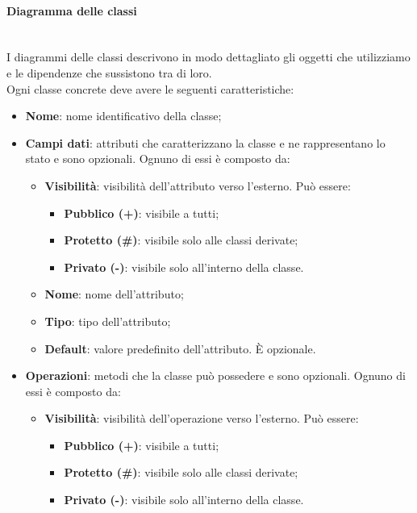 			\paragraph*{Diagramma delle classi}\mbox{}\\ [1mm]
			I diagrammi delle classi descrivono in modo dettagliato gli oggetti che utilizziamo e le dipendenze che sussistono tra di loro. \\
			Ogni classe concrete deve avere le seguenti caratteristiche:
			\begin{itemize}
				\item \textbf{Nome}: nome identificativo della classe;
				\item \textbf{Campi dati}: attributi che caratterizzano la classe e ne rappresentano lo stato e sono opzionali. Ognuno di essi è composto da:
					\begin{itemize}
						\item \textbf{Visibilità}: visibilità dell'attributo verso l'esterno. Può essere:
						\begin{itemize}
							\item \textbf{Pubblico (+)}: visibile a tutti;
							\item \textbf{Protetto (\#)}: visibile solo alle classi derivate;
							\item \textbf{Privato (-)}: visibile solo all'interno della classe.
						\end{itemize}
						\item \textbf{Nome}: nome dell'attributo;
						\item \textbf{Tipo}: tipo dell'attributo;
						\item \textbf{Default}: valore predefinito dell'attributo. È opzionale.
					\end{itemize}
				\item \textbf{Operazioni}: metodi che la classe può possedere e sono opzionali. Ognuno di essi è composto da:
					\begin{itemize}
						\item \textbf{Visibilità}: visibilità dell'operazione verso l'esterno. Può essere:
						\begin{itemize}
							\item \textbf{Pubblico (+)}: visibile a tutti;
							\item \textbf{Protetto (\#)}: visibile solo alle classi derivate;
							\item \textbf{Privato (-)}: visibile solo all'interno della classe.
						\end{itemize}

\end{itemize}
\end{itemize}
